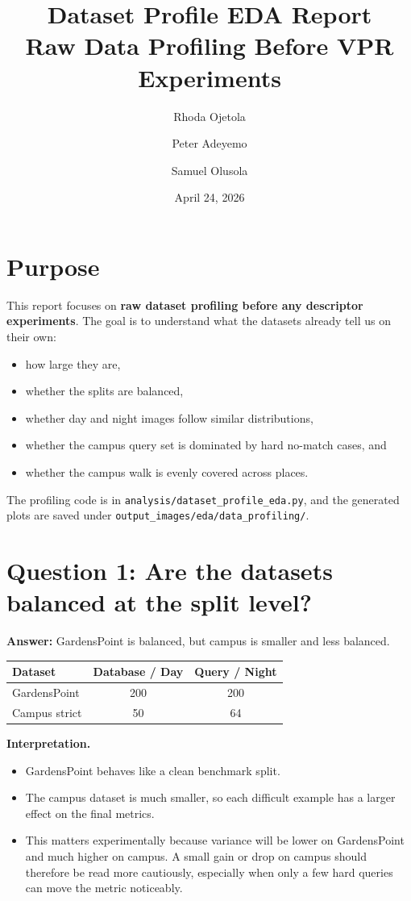 \documentclass[11pt]{article}
\title{\textbf{Dataset Profile EDA Report}\\[4pt]
Raw Data Profiling Before VPR Experiments}
\author{Rhoda Ojetola \and Peter Adeyemo \and Samuel Olusola}
\date{April 24, 2026}
\begin{document}
\maketitle

\section*{Purpose}
This report focuses on \textbf{raw dataset profiling before any descriptor experiments}. The goal is to understand what the datasets already tell us on their own:
\begin{itemize}[leftmargin=*]
  \item how large they are,
  \item whether the splits are balanced,
  \item whether day and night images follow similar distributions,
  \item whether the campus query set is dominated by hard no-match cases, and
  \item whether the campus walk is evenly covered across places.
\end{itemize}

The profiling code is in \texttt{analysis/dataset\_profile\_eda.py}, and the generated plots are saved under \texttt{output\_images/eda/data\_profiling/}.

\section*{Question 1: Are the datasets balanced at the split level?}
\textbf{Answer:} GardensPoint is balanced, but campus is smaller and less balanced.

\begin{center}
\begin{tabular}{lcc}
\toprule
\textbf{Dataset} & \textbf{Database / Day} & \textbf{Query / Night} \\
\midrule
GardensPoint & 200 & 200 \\
Campus strict & 50 & 64 \\
\bottomrule
\end{tabular}
\end{center}

\textbf{Interpretation.}
\begin{itemize}[leftmargin=*]
  \item GardensPoint behaves like a clean benchmark split.
  \item The campus dataset is much smaller, so each difficult example has a larger effect on the final metrics.
  \item This matters experimentally because variance will be lower on GardensPoint and much higher on campus. A small gain or drop on campus should therefore be read more cautiously, especially when only a few hard queries can move the metric noticeably.
\end{itemize}
\end{document}
